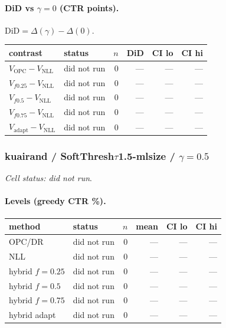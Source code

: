 \documentclass[10pt,a4paper]{article}
\begin{document}
\paragraph{DiD vs $\gamma=0$ (CTR points).} $\mathrm{DiD}=\Delta(\gamma)-\Delta(0)$.
{\centering\small\begin{tabular}{llrrrr}
\toprule contrast & status & $n$ & DiD & CI lo & CI hi \\
\midrule
$V_{\mathrm{OPC}}-V_{\mathrm{NLL}}$ & did not run & 0 & --- & --- & --- \\
$V_{f0.25}-V_{\mathrm{NLL}}$ & did not run & 0 & --- & --- & --- \\
$V_{f0.5}-V_{\mathrm{NLL}}$ & did not run & 0 & --- & --- & --- \\
$V_{f0.75}-V_{\mathrm{NLL}}$ & did not run & 0 & --- & --- & --- \\
$V_{\mathrm{adapt}}-V_{\mathrm{NLL}}$ & did not run & 0 & --- & --- & --- \\
\bottomrule\end{tabular}\par}
\bigskip
\subsubsection{kuairand / SoftThresh$\tau$1.5-mlsize / $\gamma=0.5$}
\emph{Cell status: did not run}.
\paragraph{Levels (greedy CTR \%).}
{\centering\small\begin{tabular}{llrrrr}
\toprule method & status & $n$ & mean & CI lo & CI hi \\
\midrule
OPC/DR & did not run & 0 & --- & --- & --- \\
NLL & did not run & 0 & --- & --- & --- \\
hybrid $f{=}0.25$ & did not run & 0 & --- & --- & --- \\
hybrid $f{=}0.5$ & did not run & 0 & --- & --- & --- \\
hybrid $f{=}0.75$ & did not run & 0 & --- & --- & --- \\
hybrid adapt & did not run & 0 & --- & --- & --- \\
\bottomrule\end{tabular}\par}
\end{document}

